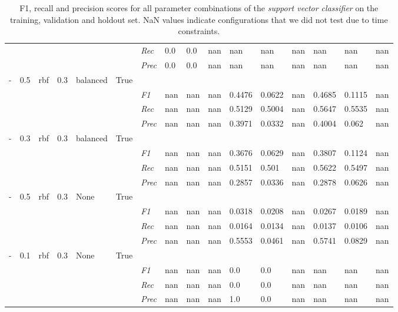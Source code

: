 \begin{table}[H]
\begin{tabularx}{\textwidth}{XXXXXX|X|XXX|XXX|XXX}
    & & & & & & \textit{Rec} & 0.0 & 0.0 & nan    & nan & nan    & nan    & nan    & nan    & nan    \\
    & & & & & & \textit{Prec} & 0.0 & 0.0 & nan & nan & nan & nan & nan & nan & nan \\ \midrule
    - & 0.5 & rbf & 0.3 & balanced &True & & & & & & & & & \\
    & & & & & & \textit{F1} & nan & nan & nan & 0.4476 & 0.0622        & nan        & 0.4685        & 0.1115        & nan        \\
    & & & & & & \textit{Rec} & nan & nan & nan    & 0.5129 & 0.5004    & nan    & 0.5647    & 0.5535    & nan    \\
    & & & & & & \textit{Prec} & nan & nan & nan & 0.3971 & 0.0332 & nan & 0.4004 & 0.062 & nan \\ \midrule
    - & 0.3 & rbf & 0.3 & balanced &True & & & & & & & & & \\
    & & & & & & \textit{F1} & nan & nan & nan & 0.3676 & 0.0629        & nan        & 0.3807        & 0.1124        & nan        \\
    & & & & & & \textit{Rec} & nan & nan & nan    & 0.5151 & 0.501    & nan    & 0.5622    & 0.5497    & nan    \\
    & & & & & & \textit{Prec} & nan & nan & nan & 0.2857 & 0.0336 & nan & 0.2878 & 0.0626 & nan \\ \midrule
    - & 0.5 & rbf & 0.3 & None &True & & & & & & & & & \\
    & & & & & & \textit{F1} & nan & nan & nan & 0.0318 & 0.0208        & nan        & 0.0267        & 0.0189        & nan        \\
    & & & & & & \textit{Rec} & nan & nan & nan    & 0.0164 & 0.0134    & nan    & 0.0137    & 0.0106    & nan    \\
    & & & & & & \textit{Prec} & nan & nan & nan & 0.5553 & 0.0461 & nan & 0.5741 & 0.0829 & nan \\ \midrule
    - & 0.1 & rbf & 0.3 & None &True & & & & & & & & & \\
    & & & & & & \textit{F1} & nan & nan & nan & 0.0 & 0.0        & nan        & nan        & nan        & nan        \\
    & & & & & & \textit{Rec} & nan & nan & nan    & 0.0 & 0.0    & nan    & nan    & nan    & nan    \\
    & & & & & & \textit{Prec} & nan & nan & nan & 1.0 & 0.0 & nan & nan & nan & nan \\ \midrule
    \end{tabularx}
\caption{F1, recall and precision scores for all parameter combinations of the \textit{support vector classifier} on the training, validation and holdout set. NaN values indicate configurations that we did not test due to time constraints.}
\label{tab:all_results_svm}
\end{table}